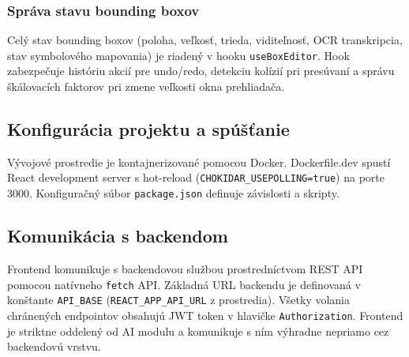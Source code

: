\subsubsection{Správa stavu bounding boxov}

Celý stav bounding boxov (poloha, veľkosť, trieda, viditeľnosť, OCR transkripcia, stav symbolového mapovania) je riadený v hooku \texttt{useBoxEditor}. Hook zabezpečuje históriu akcií pre undo/redo, detekciu kolízií pri presúvaní a správu škálovacích faktorov pri zmene veľkosti okna prehliadača.

\subsection{Konfigurácia projektu a spúšťanie}

Vývojové prostredie je kontajnerizované pomocou Docker. Dockerfile.dev spustí React development server s hot-reload (\texttt{CHOKIDAR\_USEPOLLING=true}) na porte 3000. Konfiguračný súbor \texttt{package.json} definuje závislosti a skripty.

\subsection{Komunikácia s backendom}

Frontend komunikuje s backendovou službou prostredníctvom REST API pomocou natívneho \texttt{fetch} API. Základná URL backendu je definovaná v konštante \texttt{API\_BASE} (\texttt{REACT\_APP\_API\_URL} z prostredia). Všetky volania chránených endpointov obsahujú JWT token v hlavičke \texttt{Authorization}. Frontend je striktne oddelený od AI modulu a komunikuje s ním výhradne nepriamo cez backendovú vrstvu.

